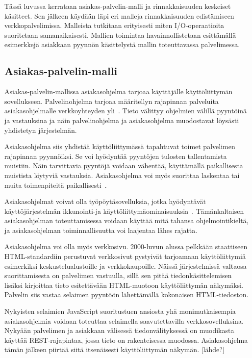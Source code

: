 \documentclass[finnish]{tktltiki2}
\theoremstyle{definition}
\theoremstyle{remark}
\begin{document}
Tässä luvussa kerrataan
asiakas-palvelin-malli ja rinnakkaisuuden keskeiset käsitteet.
Sen jälkeen käydään läpi eri malleja rinnakkaisuuden edistämiseen
verkkopalvelimissa. Malleista tutkitaan erityisesti miten I/O-operaatioita
suoritetaan samanaikaisesti. Mallien toimintaa havainnollistetaan
esittämällä esimerkkejä asiakkaan pyynnön käsittelystä mallin
toteuttavassa palvelimessa.

\subsection{Asiakas-palvelin-malli}
Asiakas-palvelin-mallissa
asiakasohjelma tarjoaa käyttäjälle käyttöliittymän sovellukseen. Palvelinohjelma
tarjoaa määritellyn rajapinnan
palveluita asiakasohjelmalle verkkoyhteyden yli~\cite{sinha_client-server_1992}.
Tieto välittyy ohjelmien välillä pyyntöinä ja vastauksina ja näin palvelinohjelma ja
asiakasohjelma
muodostavat löysästi yhdistetyn järjestelmän.

Asiakasohjelma siis yhdistää käyttöliittymässä tapahtuvat toimet palvelimen
rajapinnan pyynnöiksi. Se voi hyödyntää pyyntöjen tulosten tallentamista
muistiin. Näin tarvittavia pyyntöjä voidaan vähentää, käyttämällä
paikallisesta muistista löytyviä vastauksia.
Asiakasohjelma voi myös suorittaa
laskentaa tai muita toimenpiteitä paikallisesti~\cite{sinha_client-server_1992}.

Asiakasohjelmat voivat olla työpöytäsovelluksia, jotka hyödyntävät käyttöjärjestelmän
ikkunointi-ja käyttöliittymäominaisuuksia~\cite{sinha_client-server_1992}.
Tämänkaltaisen asiakasohjelman toteuttamisessa voidaan käyttää mitä tahansa ohjelmointikieltä,
ja asiakasohjelman toiminnallisuutta voi laajentaa lähes rajatta.

Asiakasohjelma voi olla myös verkkosivu. 2000-luvun alussa
pelkkään staattiseen HTML-standardiin perustuvat verkkosivut pystyivät
tarjoamaan käyttöliittymiä esimerkiksi keskustelualustoille ja verkkokaupoille.
Näissä järjestelmissä valtaosa suorittamisesta on palvelimen vastuulla,
sillä sen pitää tiedonkäsittelemisen lisäksi kirjoittaa tieto
esitettävään HTML-muotoon käyttöliittymän näkymäksi. Palvelin
siis vastaa selaimen pyyntöön lähettämällä kokonaisen HTML-tiedoston.

Nykyisten selaimien JavaScript suoritustuen ansiosta yhä
monimutkaisempia asiakasohjelmia voidaan toteuttaa
selaimella saavutettavilla verkkosovelluksina.
Nykyään palvelimen ja asiakkaan
välisessä tiedonvälityksessä on muodikasta käyttää REST-rajapintaa, jossa
tieto on rakenteisessa muodossa. Asiakasohjelma tämän jälkeen piirtää siitä
itsenäisesti käyttöliittymän näkymän. [lähde?]
\end{document}
